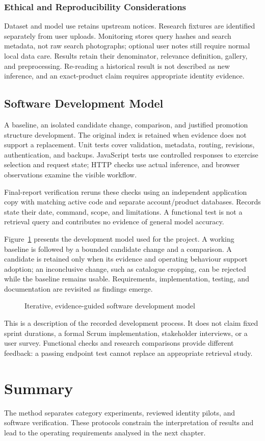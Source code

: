 \subsubsection{Ethical and Reproducibility Considerations}
Dataset and model use retains upstream notices. Research fixtures are
identified separately from user uploads. Monitoring stores query hashes and
search metadata, not raw search photographs; optional user notes still require
normal local data care. Results retain their denominator, relevance definition,
gallery, and preprocessing. Re-reading a historical result is not described as
new inference, and an exact-product claim requires appropriate identity evidence.

\subsection{Software Development Model}
A baseline, an isolated candidate change, comparison, and justified promotion
structure development. The original index is retained when evidence does not
support a replacement. Unit tests cover validation, metadata, routing, revisions,
authentication, and backups. JavaScript tests use controlled responses to exercise
selection and request state; HTTP checks use actual inference, and browser
observations examine the visible workflow.

Final-report verification reruns these checks using an independent application
copy with matching active code and separate account/product databases. Records
state their date, command, scope, and limitations. A functional test is not a
retrieval query and contributes no evidence of general model accuracy.


Figure~\ref{fig:development-cycle} presents the development model used for the
project. A working baseline is followed by a bounded candidate change and a
comparison. A candidate is retained only when its evidence and operating
behaviour support adoption; an inconclusive change, such as catalogue cropping,
can be rejected while the baseline remains usable. Requirements, implementation,
testing, and documentation are revisited as findings emerge.

\begin{figure}[H]\centering
\caption{Iterative, evidence-guided software development model}
\label{fig:development-cycle}\end{figure}

This is a description of the recorded development process. It does not claim
fixed sprint durations, a formal Scrum implementation, stakeholder interviews,
or a user survey. Functional checks and research comparisons provide different
feedback: a passing endpoint test cannot replace an appropriate retrieval study.

\section{Summary}
The method separates category experiments, reviewed identity pilots, and software
verification. These protocols constrain the interpretation of results and lead
to the operating requirements analysed in the next chapter.
